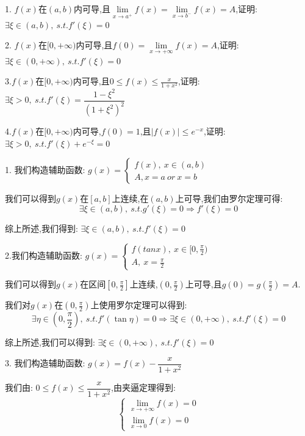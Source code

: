\begin{proposition}
	1. $f(x)$在$(a,b)$内可导,且$\lim\limits_{x\rightarrow a^{+}}f(x)=\lim\limits_{x\rightarrow b^{-}}f(x)=A$,证明: $\exists \xi\in(a,b),\ s.t. f'(\xi)=0$

	2. $f(x)$在$[0,+\infty)$内可导,且$f(0)=\lim\limits_{x\rightarrow +\infty}f(x)=A$,证明: $\exists \xi\in(0,+\infty),\ s.t. f'(\xi)=0$

	3.$f(x)$在$[0,+\infty)$内可导,且$0\leq f(x)\leq \frac{x}{1+x^2}$,证明: $\exists \xi>0,\ s.t. f'(\xi)=\dfrac{1-\xi^2}{(1+\xi^2)^2}$

	4.$f(x)$在$[0,+\infty)$内可导,$f(0)=1$,且$|f(x)|\leq e^{-x}$,证明: $\exists \xi>0,\ s.t. f'(\xi)+e^{-\xi}=0$

\end{proposition}
\begin{solution}

	1. 我们构造辅助函数: $g(x)=\left\lbrace
		\begin{array}{l}
			f(x),\ x\in(a,b) \\
			A,x=a\ or\ x=b
		\end{array}
		\right. $

	我们可以得到$g(x)$在$[a,b]$上连续,在$(a,b)$上可导,我们由罗尔定理可得:
	$$\exists\xi\in(a,b),\ s.t. g'(\xi)=0\Rightarrow f'(\xi)=0$$

	综上所述,我们得到: $\exists \xi\in(a,b),\ s.t. f'(\xi)=0$


	2.我们构造辅助函数: $g(x)=\left\lbrace
		\begin{array}{l}
			f(tan x),\ x\in[0,\frac{\pi}{2}) \\
			A,\ x=\frac{\pi}{2}
		\end{array}
		\right. $

	我们可以得到$g(x)$在区间$[0,\frac{\pi}{2}]$上连续,$(0,\frac{\pi}{2})$上可导,且$g(0)=g(\frac{\pi}{2})=A$.

	我们对$g(x)$在$(0,\frac{\pi}{2})$上使用罗尔定理可以得到:
	$$\exists\eta\in(0,\frac{\pi}{2}),\ s.t. f'(\tan \eta)=0\Rightarrow \exists \xi\in(0,+\infty),\ s.t. f'(\xi)=0$$

	综上所述,我们可以得到: $\exists \xi\in(0,+\infty),\ s.t. f'(\xi)=0$


	3. 我们构造辅助函数: $g(x)=f(x)-\dfrac{x}{1+x^2}$

	我们由: $0\leq f(x)\leq \dfrac{x}{1+x^2}$,由夹逼定理得到:
	$$\left\lbrace
		\begin{array}{l}
			\lim\limits_{x\rightarrow +\infty}f(x)=0 \\
			\lim\limits_{x\rightarrow 0}f(x)=0
		\end{array}
		\right. $$


\end{solution}
